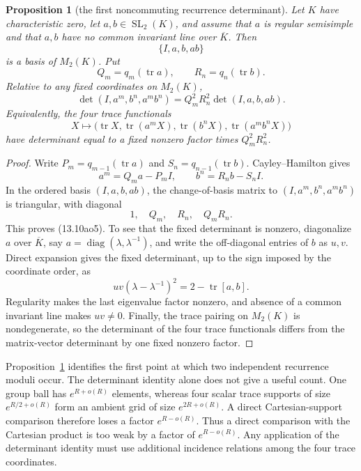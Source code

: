 \documentclass[11pt,reqno]{amsart}
\newtheorem{proposition}[theorem]{Proposition}
\theoremstyle{definition}
\theoremstyle{remark}
\newcommand{\Tr}{\operatorname{tr}}
\newcommand{\SL}{\operatorname{SL}}
\begin{document}
\begin{proposition}[the first noncommuting recurrence determinant]
\label{prop:noncommuting-recurrence-determinant}
Let \(K\) have characteristic zero, let \(a,b\in\SL_2(K)\), and assume
that \(a\) is regular semisimple and that \(a,b\) have no common invariant
line over \(\overline K\).  Then
\[
 \{I,a,b,ab\}
\]
is a basis of \(M_2(K)\).  Put
\[
 Q_m=q_m(\Tr a),\qquad R_n=q_n(\Tr b).
\]
Relative to any fixed coordinates on \(M_2(K)\),
\[
 \det(I,a^m,b^n,a^mb^n)
 =Q_m^2R_n^2\det(I,a,b,ab).
\tag{13.10ao5}
\]
Equivalently, the four trace functionals
\[
 X\longmapsto
 \bigl(\Tr X,\Tr(a^mX),\Tr(b^nX),\Tr(a^mb^nX)\bigr)
\]
have determinant equal to a fixed nonzero factor times \(Q_m^2R_n^2\).
\end{proposition}

\begin{proof}
Write \(P_m=q_{m-1}(\Tr a)\) and
\(S_n=q_{n-1}(\Tr b)\).  Cayley--Hamilton gives
\[
 a^m=Q_ma-P_mI,\qquad b^n=R_nb-S_nI.
\]
In the ordered basis \((I,a,b,ab)\), the change-of-basis matrix to
\((I,a^m,b^n,a^mb^n)\) is triangular, with diagonal
\[
 1,\quad Q_m,\quad R_n,\quad Q_mR_n.
\]
This proves (13.10ao5).  To see that the fixed determinant is nonzero,
diagonalize \(a\) over \(\overline K\), say
\(a=\operatorname{diag}(\lambda,\lambda^{-1})\), and write the
off-diagonal entries of \(b\) as \(u,v\).  Direct expansion gives the
fixed determinant, up to the sign imposed by the coordinate order, as
\[
 uv(\lambda-\lambda^{-1})^2
 =2-\Tr[a,b].
\]
Regularity makes the last eigenvalue factor nonzero, and absence of a
common invariant line makes \(uv\ne0\).  Finally, the trace pairing on
\(M_2(K)\) is nondegenerate, so the determinant of the four trace
functionals differs from the matrix-vector determinant by one fixed
nonzero factor.
\end{proof}

Proposition~\ref{prop:noncommuting-recurrence-determinant} identifies the
first point at which two independent recurrence moduli occur.  The
determinant identity alone does not give a useful count.  One group ball has
\(e^{R+o(R)}\) elements, whereas four scalar trace supports of size
\(e^{R/2+o(R)}\) form an ambient grid of size \(e^{2R+o(R)}\).  A direct
Cartesian-support comparison therefore loses a factor \(e^{R-o(R)}\).
Thus a direct comparison with the Cartesian product is too weak by a factor
of \(e^{R-o(R)}\).  Any application of the determinant identity must use
additional incidence relations among the four trace coordinates.
\end{document}
